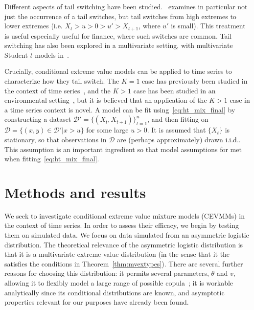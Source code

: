 \documentclass[11pt,twoside,openany]{book}
\newcommand{\D}{\mathcal{D}}
\numberwithin{Theorem}{chapter}
\numberwithin{Definition}{chapter}
\numberwithin{Lemma}{chapter}
\numberwithin{Algorithm}{chapter}
\numberwithin{equation}{chapter}
\begin{document}

Different aspects of tail switching have been
studied.~\cite{bortot2003extremes} examines in particular not just the
occurrence of a tail switches, but tail switches from high extremes to lower
extremes (i.e. $X_t > u > 0 > u' > X_{t+1}$, where $u'$ is small). This
treatment is useful especially useful for finance, where such switches are
common. Tail switching has also been explored in a multivariate setting,
with multivariate Student-$t$ models in~\cite{bernardi2013multivariate}.

Crucially, conditional extreme value models can be applied to time series to
characterize how they tail switch.
The $K=1$ case has previously been studied in the context of time series~\citep{auldphdthesis},
and the $K>1$ case has been studied in an environmental setting~\citep{tendijck2021modeling},
but it is believed that an application of the $K>1$ case in a time series context is novel.
A model can be fit using~\eqref{eq:ht_mix_final} by constructing a dataset $\D' =
\{(X_{t}, X_{t+1})\}_{t=1}^n$, and then fitting on $\D = \{(x,y) \in \D' | x > u\}$ for some large $u>0$.
It is assumed that $\{X_t\}$ is stationary, so that observations in $\D$ are (perhaps approximately) drawn i.i.d.. This assumption is an important ingredient so that model assumptions for met when fitting~\eqref{eq:ht_mix_final}.


\cleardoublepage

\chapter{Methods and results}\label{sec:methods}

We seek to investigate conditional extreme value mixture models (CEVMMs) in the
context of time series. In order to assess their efficacy, we begin by testing
them on simulated data. We focus on data simulated from an asymmetric logistic
distribution. The theoretical relevance of the asymmetric
logistic distribution is that it is a multivariate extreme value distribution
(in the sense that it the satisfies the conditions in
Theorem~\ref{thm:mvextypes}). There are several further reasons for choosing
this distribution: it permits several parameters, $\theta$ and $v$, allowing it
to flexibly model a large range of possible
copula~\citep{coles1991modelling}; it is workable analytically since its
conditional distributions are known, and asymptotic properties relevant for our
purposes have already been found.
\end{document}
